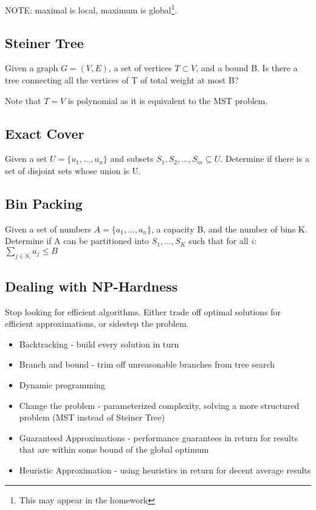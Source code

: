 \documentclass[a4paper]{article}
\begin{document}
NOTE: maximal is local, maximum is global\footnote{This may appear in the homework}.

\subsection{Steiner Tree}
Given a graph $G=(V,E)$, a set of vertices $T \subset V$, and a bound B. Is there a tree connecting all the vertices of T of total weight at most B?

Note that $T=V$ is polynomial as it is equivalent to the MST problem.



\subsection{Exact Cover}
Given a set $U=\{u_1,...,u_n\}$ and subsets $S_1, S_2, ..., S_m \subseteq U$. Determine if there is a set of disjoint sets whose union is U.


\subsection{Bin Packing}
Given a set of numbers $A=\{a_1,...,a_n\}$, a capacity B, and the number of bins K. Determine if A can be partitioned into $S_1,...,S_K$ such that for all $i$: $\sum\limits_{j\in S_i} a_j \le B$


\subsection{Dealing with NP-Hardness}
Stop looking for efficient algorithms. Either trade off optimal solutions for efficient approximations, or sidestep the problem.

\begin{itemize}
  \item Backtracking - build every solution in turn
  \item Branch and bound - trim off unreasonable branches from tree search
  \item Dynamic programming
  \item Change the problem - parameterized complexity, solving a more structured problem (MST instead of Steiner Tree)
  \item Guaranteed Approximations - performance guarantees in return for results that are within some bound of the global optimum
  \item Heuristic Approximation - using heuristics in return for decent average results
\end{itemize}
\end{document}
